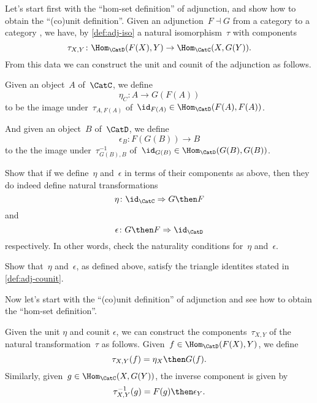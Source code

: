 Let's start first with the ``hom-set definition'' of adjunction, and show how to obtain the ``(co)unit definition''.
Given an adjunction~$F \dashv G$ from a category \CatC to a category \CatD, we have, by \cref{def:adj-iso} a natural isomorphism~$\tau$ with components
\begin{equation*}
    \tau_{X,Y} \colon \Hom_{\CatD}(F(X) ,Y ) \to \Hom_{\CatC}(X , G(Y) ).
\end{equation*}
From this data we can construct the unit and counit of the adjunction as follows.

Given an object~$A$ of~$\CatC$, we define
\begin{equation*}
    \eta_C \colon A \to G(F(A))
\end{equation*}
to be the image under~$\tau_{A, F(A)}$ of~$\id_{F(A)} \in \Hom_{\CatD}(F (A) , F(A) )$.

And given an object~$B$ of~$\CatD$, we define
\begin{equation*}
    \epsilon_B \colon F(G(B)) \to B
\end{equation*}
to the the image under~$\tau_{G(B), B}^{-1}$ of~$\id_{G(B)} \in \Hom_{\CatD}(G(B), G(B))$.

\begin{exercise}
    Show that if we define~$\eta$ and~$\epsilon$ in terms of their components as above, then they do indeed define natural transformations
    \begin{equation*}
        \eta\colon \id_{\CatC} \Rightarrow G\then F
    \end{equation*}
    and
    \begin{equation*}
        \epsilon\colon G \then F \Rightarrow \id_{\CatD}
    \end{equation*}
    respectively. In other words, check the naturality conditions for~$\eta$ and~$\epsilon$.
\end{exercise}

\begin{exercise}
    Show that~$\eta$ and~$\epsilon$, as defined above, satisfy the triangle identites stated in \cref{def:adj-counit}.
\end{exercise}

Now let's start with the ``(co)unit definition'' of adjunction and see how to obtain the ``hom-set definition''.

Given the unit $\eta$ and counit $\epsilon$, we can construct the components~$\tau_{X,Y}$ of the natural transformation~$\tau$ as follows. Given~$f \in \Hom_{\CatD}(F(X),Y)$, we define
\begin{equation*}
    \tau_{X,Y}(f) = \eta_X \then G(f).
\end{equation*}
Similarly, given~$g \in \Hom_{\CatC}(X,G(Y))$, the inverse component is given by
\begin{equation*}
    \tau_{X,Y}^{-1}(g) = F(g) \then \epsilon_Y.
\end{equation*}

